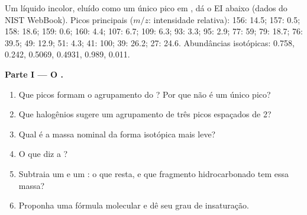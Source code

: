 \begin{problem}
\label{pb:b2:mass-spec-atomic:1}
Um líquido incolor, eluído como um único pico em , dá o  EI abaixo
(dados do NIST WebBook). Picos principais ($m/z$: intensidade relativa): 156: 14.5; 157: 0.5; 158: 18.6; 159: 0.6; 160:
4.4; 107: 6.7; 109: 6.3; 93: 3.3; 95: 2.9; 77: 59; 79: 18.7; 76: 39.5; 49: 12.9; 51: 4.3; 41: 100; 39:
26.2; 27: 24.6. Abundâncias isotópicas:  0.758,  0.242,  0.5069,
 0.4931,  0.989,  0.011.

\begin{center}
\end{center}

\medskip
\noindent\textbf{Parte I --- O .}
\begin{enumerate}
  \item Que picos formam o agrupamento do ? Por que não é um único pico?
  \item Que halogênios sugere um agrupamento de três picos espaçados de 2?
  \item Qual é a massa nominal da forma isotópica mais leve?
  \item O que diz a ?
  \item Subtraia um  e um : o que resta, e que fragmento hidrocarbonado
        tem essa massa?
  \item Proponha uma fórmula molecular e dê seu grau de insaturação.
\end{enumerate}


\end{problem}
